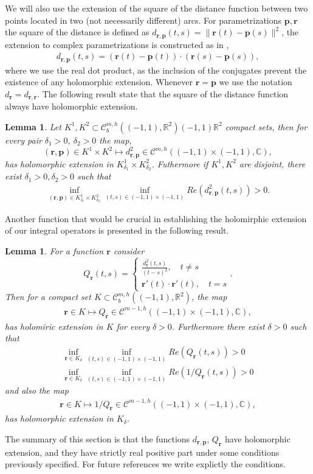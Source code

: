 \documentclass{article}
\newtheorem{lemma}[theorem]{Lemma}
\newcommand{\IC}{{\mathbb C}}
\newcommand{\IR}{{\mathbb R}}
\newcommand{\bp}{{\bm p}}
\newcommand{\cmspaceh}[4]{\mathcal{C}^{#1,#2} \left( #3, #4 \right)}
\newcommand{\rgeoh}[2]{\mathcal{C}_b^{#1,#2}\left( (-1,1), \IR^2 \right)}
\newcommand{\br}{\bm{r}}
\newcommand{\iinterv}{(-1,1)\times(-1,1)}
\begin{document}
We will also use the extension of the square of the distance function between two points located in two (not necessarily different) arcs. For parametrizations $\bp,\br$ the square of the distance is defined as $d_{\br,\bp}(t,s) = \| \br(t)-\bp(s)\|^2$, the extension to complex parametrizations is constructed as in \cite{Henriquez2021}, 
\begin{align*}
d_{\br,\bp}(t,s) = {(\br(t)-\bp(t))\cdot(\br(s)-\bp(s))},
\end{align*}
where we use the real dot product, as the inclusion of the conjugates prevent the existence of any holomorphic extension. Whenever $\br = \bp$ we use the notation $d_{\br} = d_{\br,\br}$. The following result state that the square of the distance function always have holomorphic extension.  
\begin{lemma} 
\label{lemma:squaredistance}
Let $K^1,K^2 \subset \rgeoh{m}{h}{(-1,1)}{\IR^2}$ compact sets, then for every pair $\delta_1>0, \ \delta_2 > 0$ the map, $$(\br,\bp) \in K^1 \times K^2 \mapsto d_{\br,\bp}^2 \in \cmspaceh{m}{h}{\iinterv}{\IC},$$has holomorphic extension in $K^1_{\delta_1} \times K^2_{\delta_2}$. Futhermore if $K^1,K^2$ are disjoint, there exist $\delta_1>0,\delta_2>0$ such that 
\begin{align*}
\inf_{(\br,\bp) \in K^1_{\delta_1}  \times K^2_{\delta_2}} 
\inf_{(t,s)\in \iinterv}
Re(d_{\br,\bp}^2(t,s))>0.
\end{align*}
\end{lemma}
Another function that would be crucial in establishing the holomirphic extension of our integral operators is presented in the following result.
\begin{lemma}
\label{lemma:Qfun}
For a function $\br$ consider
$$
Q_{\br}(t,s) = \begin{cases}
\frac{d^2_{\br}(t,s)}{(t-s)^2}, \quad t\neq s \\
\br '(t) \cdot \br '(t), \quad t =s 
\end{cases}.
$$
Then for a compact set $K \subset \rgeoh{m}{h}$, the map  
\begin{align*}
\br \in K \mapsto Q_{\br} \in \cmspaceh{m-1}{h}{(-1,1)\times(-1,1)}{\IC},
\end{align*}
has holomiric extension in $K$ for every $\delta>0$. Furthermore there exist $\delta >0$ such that 
\begin{align*}
\inf_{\br \in K_\delta} \inf_{(t,s) \in (-1,1)\times (-1,1)} Re(Q_{\br}(t,s)) >0 \\
\inf_{\br \in K_\delta} \inf_{(t,s) \in (-1,1)\times (-1,1)} Re(1/Q_{\br}(t,s)) >0 
\end{align*}
and also the map 
\begin{align*}
\br \in K \mapsto 1/Q_{\br} \in \cmspaceh{m-1}{h}{(-1,1)\times(-1,1)}{\IC}, 
\end{align*} 
has holomorphic extension in $K_\delta$.
\end{lemma} 
The summary of this section is that the functions $d_{\br,\bp}$, $Q_{\br}$ have holomorphic extension, and they have strictly real positive part under some conditions previously specified. For future references we write explictly the conditions.
\end{document}
